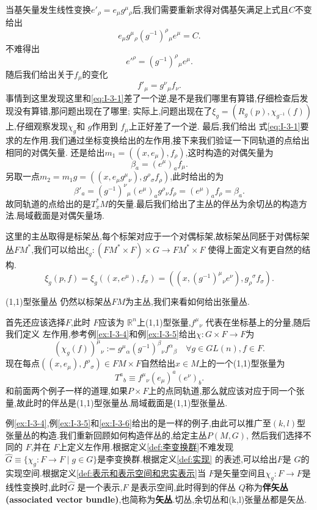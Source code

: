 \documentclass[../main.tex]{subfiles}
\begin{document}
当基矢量发生线性变换$e'_\rho = e_\mu g^{\mu}{}_{\rho} $后,我们需要重新求得对偶基矢满足上式且$C$不变给出\[
  e_\mu g^{\mu}{}_{\rho} (g^{-1})^{\rho}{}_{\mu} e^\mu = C 
.\] 
不难得出\[
e'^\rho = (g^{-1})^{\rho}{}_{\mu}e^\mu
.\] 
随后我们给出关于$f_\mu$的变化 \[
f'_\mu = g^{\nu}{}_{\mu}f_\nu
.\] 
事情到这里发现这里和\ref{eq:I-3-1}差了一个逆,是不是我们哪里有算错,仔细检查后发现没有算错,那问题出现在了哪里;
实际上,问题出现在了$\xi_g = (R_g(p),\chi_{g^{-1}}(f))$ 上,仔细观察发现$\chi_g$和 $g$作用到 $f_\mu$上正好差了一个逆.
最后,我们给出 式\ref{eq:I-3-1}要求的左作用.我们通过坐标变换给出的左作用,接下来我们验证一下同轨道的点给出相同的对偶矢量.
还是给出$m_1 = ((x,e_\mu), f_\rho)$,这时构造的对偶矢量为\[
\beta_a = (e^\mu)_a f_\mu
.\]
另取一点$m_2 = m_1g = ((x,e_\mu g^{\mu}{}_{\nu}),g^{\rho}{}_{\sigma}f_\rho)$,此时给出的为 \[
\beta'_a = (g^{-1})^{\nu}{}_{\mu}(e^\mu)_a g^{\rho}{}_{\nu}f_\rho = (e^\mu)_a f_\rho = \beta_a
.\] 
故同轨道的点给出的是$T^*_xM$的矢量.最后我们给出了主丛的伴丛为余切丛的构造方法.局域截面是对偶矢量场.
 \begin{note}
  这里的主丛取得是标架丛,每个标架对应于一个对偶标架,故标架丛同胚于对偶标架丛$FM^*$,我们可以给出$\xi_g:(FM^* \times F) \times G \to FM^* \times F$
  使得上面定义有更自然的结构.\[
    \xi_g(p,f) = \xi_g((x,e^\mu),f_\sigma) = ((x,(g^{-1})^{\mu}{}_{\nu}e^\nu),g_{\rho}{}^{\sigma}f_\sigma)
  .\] 
\end{note}
\begin{example}
  \label{ex:I-3-6}
  {\color{red}(1,1)型张量丛} 仍然以标架丛$FM$为主丛,我们来看如何给出张量丛.
\end{example}
首先还应该选择$F$,此时 $F$应该为 $\mathbb{R}^n$上(1,1)型张量,$f^{\mu}{}_{\nu}$ 代表在坐标基上的分量,随后我们定义
左作用,参考例\ref{ex:I-3-4}和例\ref{ex:I-3-5}给出$\chi:G\times F \to F$为\[
  (\chi_g(f))^{\mu}{}_{\nu} := g^{\mu}{}_{\alpha}(g^{-1})^{\beta}{}_{\nu}f^{\alpha}{}_{\beta} \quad\forall g\in GL(n), f\in F 
.\] 
现在每点$((x,e_\mu),f^{\rho}{}_{\sigma})\in FM \times F$自然给出$x\in M$上的一个(1,1)型张量为\[
T^{a}{}_{b} \equiv f^{\mu}{}_{\nu}(e_\mu)^a(e^\nu)_b
.\] 
和前面两个例子一样的道理,如果$P\times F$上的点同轨道,那么就应该对应于同一个张量,故此时的伴丛是(1,1)型张量丛.局域截面是(1,1)型张量丛.

例\ref{ex:I-3-4},例\ref{ex:I-3-5}和\ref{ex:I-3-6}给出的是一样的例子,由此可以推广至$(k,l)$型张量丛的构造.我们重新回顾如何构造伴丛的,给定主丛$P(M,G)$,
然后我们选择不同的 $F$,并在 $F$上定义左作用.根据定义\ref{def:李变换群}不难发现$\hat{G}\equiv\{\chi_g : F\to F \mid g\in G\}$是李变换群.根据定义\ref{def:实现}
的表述,可以给出$F$是 $G$的实现空间.根据定义\ref{def:表示和表示空间和忠实表示}当 $F$是矢量空间且$\chi_g:F\to F$是线性变换时,此时$\hat{G}$ 是一个表示,$F$
是表示空间,此时得到的伴丛 $Q$称为\textbf{伴矢丛(associated vector bundle)},也简称为\textbf{矢丛}.切丛,余切丛和(k,l)张量丛都是矢丛.
\end{document}
